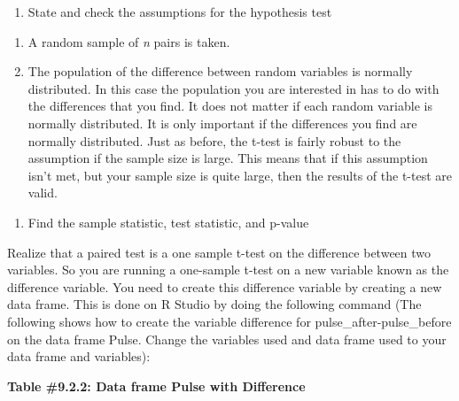 \documentclass[
]{book}
\newenvironment{Shaded}{\begin{snugshade}}{\end{snugshade}}
\newcommand{\DataTypeTok}[1]{\textcolor[rgb]{0.13,0.29,0.53}{#1}}
\newcommand{\KeywordTok}[1]{\textcolor[rgb]{0.13,0.29,0.53}{\textbf{#1}}}
\newcommand{\NormalTok}[1]{#1}
\newcommand{\OperatorTok}[1]{\textcolor[rgb]{0.81,0.36,0.00}{\textbf{#1}}}
\newcommand{\StringTok}[1]{\textcolor[rgb]{0.31,0.60,0.02}{#1}}
\providecommand{\tightlist}{%
  \setlength{\itemsep}{0pt}\setlength{\parskip}{0pt}}
\begin{document}
\begin{enumerate}
\def\labelenumi{\arabic{enumi}.}
\setcounter{enumi}{2}
\tightlist
\item
  State and check the assumptions for the hypothesis test
\end{enumerate}

\begin{enumerate}
\def\labelenumi{\alph{enumi}.}
\item
  A random sample of \emph{n} pairs is taken.
\item
  The population of the difference between random variables is normally distributed. In this case the population you are interested in has to do with the differences that you find. It does not matter if each random variable is normally distributed. It is only important if the differences you find are normally distributed. Just as before, the t-test is fairly robust to the assumption if the sample size is large. This means that if this assumption isn't met, but your sample size is quite large, then the results of the t-test are valid.
\end{enumerate}

\begin{enumerate}
\def\labelenumi{\arabic{enumi}.}
\setcounter{enumi}{3}
\tightlist
\item
  Find the sample statistic, test statistic, and p-value
\end{enumerate}

Realize that a paired test is a one sample t-test on the difference between two variables. So you are running a one-sample t-test on a new variable known as the difference variable. You need to create this difference variable by creating a new data frame. This is done on R Studio by doing the following command (The following shows how to create the variable difference for pulse\_after-pulse\_before on the data frame Pulse. Change the variables used and data frame used to your data frame and variables):

\textbf{Table \#9.2.2: Data frame Pulse with Difference}

\begin{Shaded}
\end{Shaded}
\end{document}
